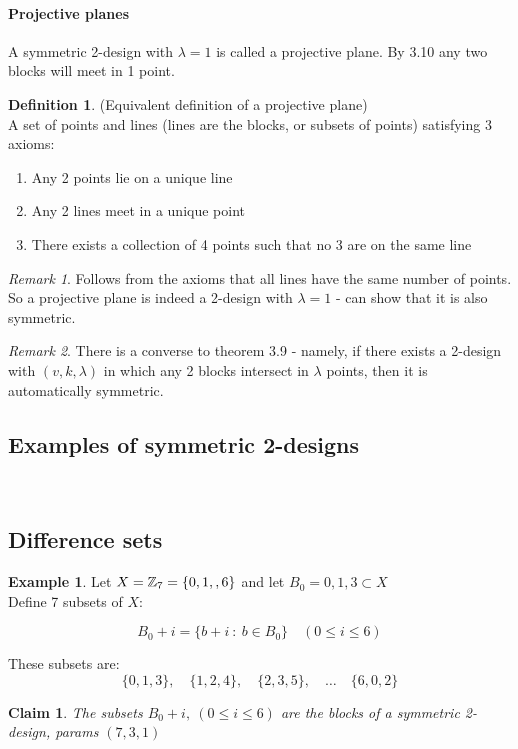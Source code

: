 \documentclass[]{article}
\newtheorem*{clm}{Claim}
\theoremstyle{definition}
\newtheorem*{defn}{Definition}
\newtheorem*{exmp}{Example}
\theoremstyle{remark}
\newtheorem*{rem}{Remark}
\numberwithin{equation}{section}
\begin{document}
		\paragraph*{Projective planes}
			A symmetric 2-design with $\lambda = 1$ is called a projective plane. By 3.10 any two blocks will meet in 1 point. 

			\begin{defn}(Equivalent definition of a projective plane)\hfill\\
				A set of points and lines (lines are the blocks, or subsets of points) satisfying 3 axioms:
				\begin{enumerate}
					\item Any 2 points lie on a unique line
					\item Any 2 lines meet in a unique point
					\item There exists a collection of 4 points such that no 3 are on the same line
				\end{enumerate}
			\end{defn}

			\begin{rem}
				Follows from the axioms that all lines have the same number of points. So a projective plane is indeed a 2-design with $\lambda = 1$ - can show that it is also symmetric.
			\end{rem}

			\begin{rem}
				There is a converse to theorem 3.9 - namely, if there exists a 2-design with $(v, k, \lambda)$ in which any 2 blocks intersect in $\lambda $ points, then it is automatically symmetric.
			\end{rem}

	\subsection{Examples of symmetric 2-designs}\hfill\\		
		\subsection*{Difference sets}
			\begin{exmp}
				Let $X = \ZZ_7 = \{0, 1, \hfill, 6\}$ and let $B_0 = {0, 1, 3} \subset X$\\
				Define 7 subsets of $X$:

				\[
					B_0 + i = \{b+i\ :\ b \in B_0\} \quad (0 \leq i \leq 6)
				\]

				These subsets are:
				\[
					\{0, 1, 3\}, \quad \{1, 2, 4\}, \quad \{2, 3, 5\},\quad \hdots \quad \{6,0,2\}
				\]
			\end{exmp}
			\begin{clm} The subsets $B_0 + i,\ (0 \leq i \leq 6)$ are the blocks of a symmetric 2-design, params $(7,3,1)$
			\end{clm}
\end{document}
